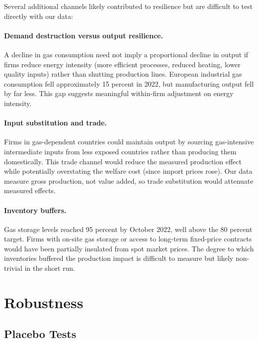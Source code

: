 \documentclass[12pt]{article}
\begin{document}
Several additional channels likely contributed to resilience but are difficult to test directly with our data:

\paragraph{Demand destruction versus output resilience.} A decline in gas consumption need not imply a proportional decline in output if firms reduce energy intensity (more efficient processes, reduced heating, lower quality inputs) rather than shutting production lines. European industrial gas consumption fell approximately 15 percent in 2022, but manufacturing output fell by far less. This gap suggests meaningful within-firm adjustment on energy intensity.

\paragraph{Input substitution and trade.} Firms in gas-dependent countries could maintain output by sourcing gas-intensive intermediate inputs from less exposed countries rather than producing them domestically. This trade channel would reduce the measured production effect while potentially overstating the welfare cost (since import prices rose). Our data measure gross production, not value added, so trade substitution would attenuate measured effects.

\paragraph{Inventory buffers.} Gas storage levels reached 95 percent by October 2022, well above the 80 percent target. Firms with on-site gas storage or access to long-term fixed-price contracts would have been partially insulated from spot market prices. The degree to which inventories buffered the production impact is difficult to measure but likely non-trivial in the short run.


\section{Robustness}
\label{sec:robustness}

\subsection{Placebo Tests}
\end{document}
